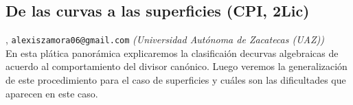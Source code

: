 \subsection{\sffamily De las curvas a las superficies {\footnotesize (CPI, 2Lic)}} \label{reg-450} 
, {\tt alexiszamora06@gmail.com}  {\slshape (Universidad Aut\'onoma de Zacatecas (UAZ))}\\
          \noindent En esta pl\'atica panor\'amica explicaremos la clasificai\'on decurvas algebraicas de acuerdo al comportamiento del divisor can\'onico. Luego veremos la generalizaci\'on de este procedimiento para el caso de superficies y cu\'ales son las dificultades que aparecen en este caso.
